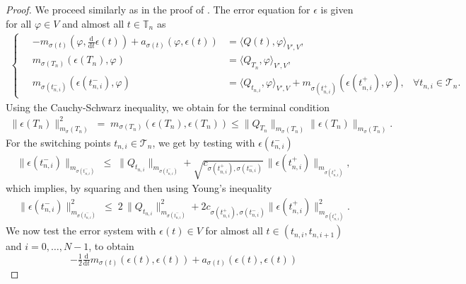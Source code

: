 \documentclass[reqno]{amsart}
\newcommand{\timeInt}{\mathbb{T}}
\newcommand{\ddt}{\tfrac{\mathrm{d}}{\mathrm{d}t}}
\newcommand{\switch}{\sigma}
\newcommand{\addErr}{\epsilon}
\newcommand{\adResidual}{Q}
\newcommand{\calT}{\mathcal{T}}
\begin{document}
\begin{proof}
	We proceed similarly as in the proof of . The error equation for $\epsilon$ is given for all $\varphi\in V$ and almost all $t\in \timeInt_n$ as
	\begin{align*}
		\left\{\quad
		\begin{aligned}
			-m_{\switch(t)}(\varphi,\ddt \epsilon(t)) + a_{\switch(t)}(\varphi,\epsilon(t)) &=  \langle \adResidual(t),\varphi\rangle_{V',V}, & \\
			m_{\switch(T_n)} (\epsilon(T_n), \varphi) &= \langle \adResidual_{T_n},\varphi \rangle_{V',V}, &  \\
            m_{\switch(t^{-}_{n,i})} (\epsilon(t_{n,i}^-), \varphi) &= \langle \adResidual_{t_{n,i}},\varphi \rangle_{V',V} + m_{\switch(t_{n,i}^+)}(\addErr(t_{n,i}^+), \varphi), & \forall t_{n,i}\in\calT_n.
		\end{aligned}\right.
	\end{align*}
	Using the Cauchy-Schwarz inequality, we obtain for the terminal condition
	\begin{align}\nonumber
		 \|\epsilon(T_n)\|_{m_\switch(T_n)}^2\;=\;m_{\switch(T_n)}(\epsilon(T_n),\epsilon(T_n)) \leq \|\adResidual_{T_n}\|_{m_\switch(T_n)} \|\epsilon(T_n)\|_{m_\switch(T_n)}.
	\end{align}
    For the switching points $t_{n,i}\in\calT_n$, we get by testing with $\epsilon(t_{n,i}^-)$
    \begin{align*}
		 \|\epsilon(t_{n,i}^-) \|_{m_{\switch(t^{-}_{n,i})}}\;\leq\; \|\adResidual_{t_{n,i}}\|_{m_{\switch(t^{-}_{n,i})}}+\sqrt{c_{\switch(t^+_{n,i}),\switch(t^-_{n,i})}}\,\| \epsilon({t^+_{n,i}})\|_{m_{\switch(t^+_{n,i})}},
	\end{align*}
    which implies, by squaring and then using Young's inequality
    \begin{align}\label{eqn:adjointBoundSwitchEnergy}
		 \|\epsilon(t_{n,i}^-) \|^2_{m_{\switch(t^{-}_{n,i})}}\;\leq\; 2\,\|\adResidual_{t_{n,i}}\|^2_{m_{\switch(t^{-}_{n,i})}}+2{c_{\switch(t^+_{n,i}),\switch(t^{-}_{n,i})}}\| \epsilon({t^+_{n,i}})\|^2_{m_{\switch(t^{+}_{n,i})}}.
	\end{align}
    We now test the error system with $\epsilon(t) \in V$ for almost all $t\in (t_{n,i},t_{n,i+1})$ and $i=0,\ldots,N-1$, to obtain
	\begin{equation*}
		-\tfrac{1}{2}\ddt m_{\switch(t)}(\epsilon(t),\epsilon(t)) + a_{\switch(t)}(\epsilon(t),\epsilon(t))

\end{equation*}
\end{proof}
\end{document}
